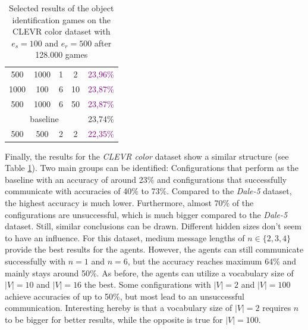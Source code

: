 \begin{table}[ht]
\begin{tabular}{cccc|c}
        {500}                         & {1000}    & {1} & {2}   & \textcolor{purple}{23,96\%}              \\
        {1000}                        & {100}     & {6} & {10}  & \textcolor{purple}{23,87\%}              \\
        {500}                         & {1000}    & {6} & {50}  & \textcolor{purple}{23,87\%}              \\\midrule
        \multicolumn{4}{c|}{baseline} & {23,74\%}                                                          \\\midrule
        {500}                         & {500}     & {2} & {2}   & \textcolor{purple}{22,35\%}              \\
        \bottomrule
    \end{tabular}
    \caption{Selected results of the object identification games on the CLEVR color dataset with $e_s=100$ and $e_r=500$ after 128.000 games}
    \label{tab:results_discriminator_color}
\end{table}

Finally, the results for the \emph{CLEVR color} dataset show a similar structure (see Table \ref{tab:results_discriminator_color}).
Two main groups can be identified: Configurations that perform as the baseline with an accuracy of around 23\% and configurations that successfully communicate with accuracies of 40\% to 73\%.
Compared to the \emph{Dale-5} dataset, the highest accuracy is much lower.
Furthermore, almost 70\% of the configurations are unsuccessful, which is much bigger compared to the \emph{Dale-5} dataset.
Still, similar conclusions can be drawn.
Different hidden sizes don't seem to have an influence.
For this dataset, medium message lengths of $n \in \{2,3,4\}$ provide the best results for the agents.
However, the agents can still communicate successfully with $n=1$ and $n=6$, but the accuracy reaches maximum 64\% and mainly stays around 50\%.
As before, the agents can utilize a vocabulary size of $|V|=10$ and $|V|=16$ the best.
Some configurations with $|V|=2$ and $|V|=100$ achieve accuracies of up to 50\%, but most lead to an unsuccessful communication.
Interesting hereby is that a vocabulary size of $|V|=2$ requires $n$ to be bigger for better results, while the opposite is true for $|V|=100$.

